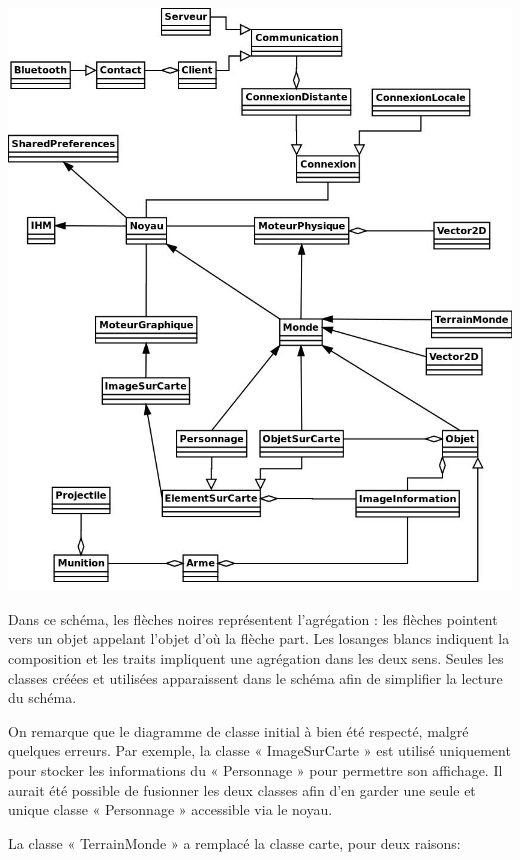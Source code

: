 \documentclass{report}
\begin{document}
\includegraphics[scale=0.5]{images/graph5}

Dans ce schéma, les flèches noires représentent l’agrégation : les
flèches pointent vers un objet appelant l’objet d’où la flèche part.
Les losanges blancs indiquent la composition et les traits impliquent
une agrégation dans les deux sens. Seules les classes créées et utilisées
apparaissent dans le schéma afin de simplifier la lecture du schéma.

On remarque que le diagramme de classe initial à bien été respecté,
malgré quelques erreurs. Par exemple, la classe « ImageSurCarte » est
utilisé uniquement pour stocker les informations du « Personnage » pour
permettre son affichage. Il aurait été possible de fusionner les deux
classes afin d’en garder une seule et unique classe « Personnage »
accessible via le noyau.

La classe « TerrainMonde » a remplacé la classe carte, pour deux
raisons:
\end{document}
